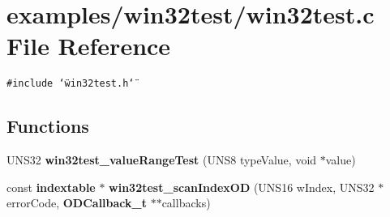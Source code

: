 \section{examples/win32test/win32test.c File Reference}
\label{win32test_8c}
{\tt \#include \char`\"{}win32test.h\char`\"{}}\par
\subsection*{Functions}
\begin{CompactItemize}
\item 
UNS32 {\bf win32test\_\-value\-Range\-Test} (UNS8 type\-Value, void $\ast$value)
\item 
const {\bf indextable} $\ast$ {\bf win32test\_\-scan\-Index\-OD} (UNS16 w\-Index, UNS32 $\ast$error\-Code, {\bf ODCallback\_\-t} $\ast$$\ast$callbacks)
\end{CompactItemize}
